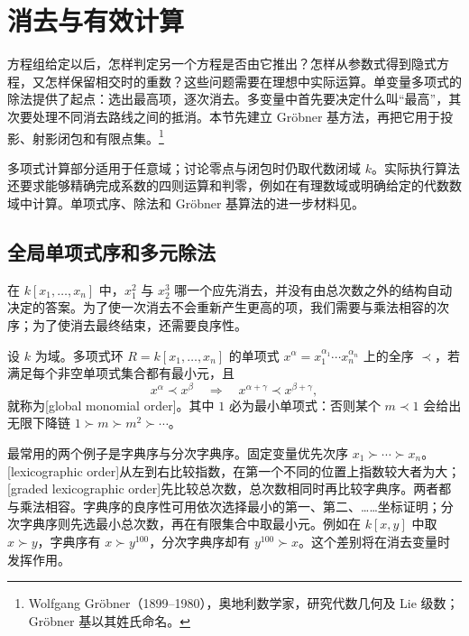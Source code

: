 
% 
% 

\section{消去与有效计算}
\label{g5:sec:0104}

方程组给定以后，怎样判定另一个方程是否由它推出？怎样从参数式得到隐式方程，又怎样保留相交时的重数？这些问题需要在理想中实际运算。单变量多项式的除法提供了起点：选出最高项，逐次消去。多变量中首先要决定什么叫“最高”，其次要处理不同消去路线之间的抵消。本节先建立 Gröbner 基方法，再把它用于投影、射影闭包和有限点集。\footnote{Wolfgang Gröbner（1899--1980），奥地利数学家，研究代数几何及 Lie 级数；Gröbner 基以其姓氏命名。}

多项式计算部分适用于任意域；讨论零点与闭包时仍取代数闭域 \(k\)。实际执行算法还要求能够精确完成系数的四则运算和判零，例如在有理数域或明确给定的代数数域中计算。单项式序、除法和 Gröbner 基算法的进一步材料见\cite[第2章第2--7节]{CoxLittleOShea2015}。

\subsection{全局单项式序和多元除法}
\label{g5:subsec:0104:01}
在 \(k[x_1,\ldots,x_n]\) 中，\(x_1^2\) 与 \(x_2^3\) 哪一个应先消去，并没有由总次数之外的结构自动决定的答案。为了使一次消去不会重新产生更高的项，我们需要与乘法相容的次序；为了使消去最终结束，还需要良序性。

\begin{definition}\label{g5:def:monomial-order}
	设 \(k\) 为域。多项式环 \(R=k[x_1,\ldots,x_n]\) 的单项式 \(x^\alpha=x_1^{\alpha_1}\cdots x_n^{\alpha_n}\) 上的全序 \(\prec\)，若满足每个非空单项式集合都有最小元，且
	\[
		x^\alpha\prec x^\beta\quad\Longrightarrow\quad x^{\alpha+\gamma}\prec x^{\beta+\gamma},
	\]
	就称为[global monomial order]。其中 \(1\) 必为最小单项式：否则某个 \(m\prec1\) 会给出无限下降链 \(1\succ m\succ m^2\succ\cdots\)。
\end{definition}

最常用的两个例子是字典序与分次字典序。固定变量优先次序 \(x_1\succ\cdots\succ x_n\)。[lexicographic order]从左到右比较指数，在第一个不同的位置上指数较大者为大；[graded lexicographic order]先比较总次数，总次数相同时再比较字典序。两者都与乘法相容。字典序的良序性可用依次选择最小的第一、第二、……坐标证明；分次字典序则先选最小总次数，再在有限集合中取最小元。例如在 \(k[x,y]\) 中取 \(x\succ y\)，字典序有 \(x\succ y^{100}\)，分次字典序却有 \(y^{100}\succ x\)。这个差别将在消去变量时发挥作用。

